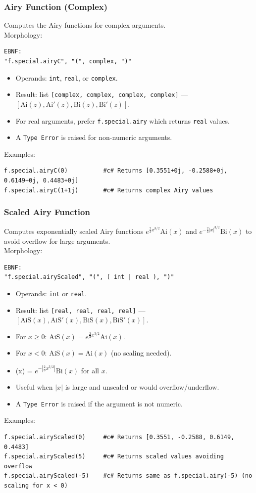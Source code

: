 \subsubsection{Airy Function (Complex)}
Computes the Airy functions for complex arguments. \\
Morphology:
\begin{verbatim}
EBNF:
"f.special.airyC", "(", complex, ")"
\end{verbatim}
\begin{itemize}
\item Operands: \texttt{int}, \texttt{real}, or \texttt{complex}.
\item Result: list \texttt{[complex, complex, complex, complex]} --- $[\text{Ai}(z), \text{Ai}'(z), \text{Bi}(z), \text{Bi}'(z)]$.
\item For real arguments, prefer \texttt{f.special.airy} which returns \texttt{real} values.
\item A \texttt{Type Error} is raised for non-numeric arguments.
\end{itemize}
Examples:
\begin{verbatim}
f.special.airyC(0)          #c# Returns [0.3551+0j, -0.2588+0j, 0.6149+0j, 0.4483+0j]
f.special.airyC(1+1j)       #c# Returns complex Airy values
\end{verbatim}

\subsubsection{Scaled Airy Function}
Computes exponentially scaled Airy functions $e^{\frac{2}{3} x^{3/2}} \text{Ai}(x)$ and $e^{-\frac{2}{3} |x|^{3/2}} \text{Bi}(x)$ to avoid overflow for large arguments. \\
Morphology:
\begin{verbatim}
EBNF:
"f.special.airyScaled", "(", ( int | real ), ")"
\end{verbatim}
\begin{itemize}
\item Operands: \texttt{int} or \texttt{real}.
\item Result: list \texttt{[real, real, real, real]} --- $[\text{AiS}(x), \text{AiS}'(x), \text{BiS}(x), \text{BiS}'(x)]$.
\item For $x \geq 0$: $\text{AiS}(x) = e^{\frac{2}{3} x^{3/2}} \text{Ai}(x)$.
\item For $x < 0$: $\text{AiS}(x) = \text{Ai}(x)$ (no scaling needed).
\item {}(x) = $e^{-|\frac{2}{3} x^{3/2}|} \text{Bi}(x)$ for all $x$.
\item Useful when $|x|$ is large and unscaled  or  would overflow/underflow.
\item A \texttt{Type Error} is raised if the argument is not numeric.
\end{itemize}
Examples:
\begin{verbatim}
f.special.airyScaled(0)     #c# Returns [0.3551, -0.2588, 0.6149, 0.4483]
f.special.airyScaled(5)     #c# Returns scaled values avoiding overflow
f.special.airyScaled(-5)    #c# Returns same as f.special.airy(-5) (no scaling for x < 0)
\end{verbatim}

